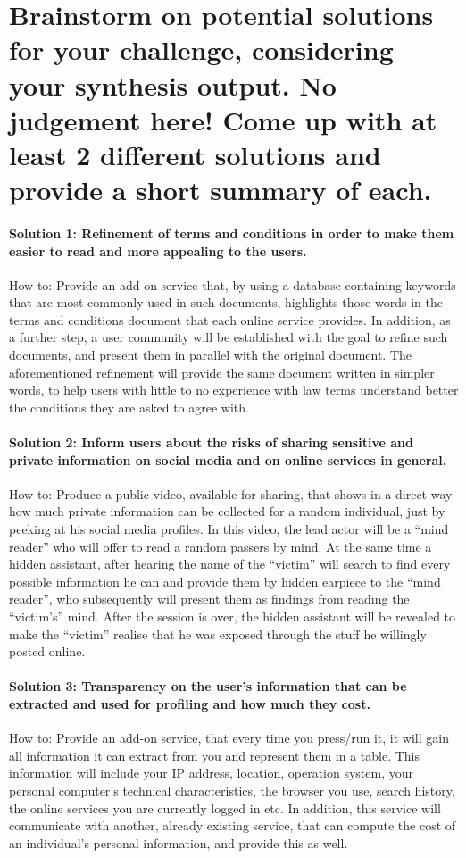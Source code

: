 \section{Brainstorm on potential solutions for your challenge, considering your 
synthesis output. No judgement here! Come up with at least 2 different solutions 
and provide a short summary of each.}
\label{s_1}

\paragraph{Solution 1: Refinement of terms and conditions in order to make them 
easier to read and more appealing to the users.} 
How to: Provide an add-on service that, by using a database containing keywords 
that are most commonly used in such documents, highlights those words in the 
terms and conditions document that each online service provides. In addition, as 
a further step, a user community will be established with the goal to refine 
such documents, and present them in parallel with the original document. The 
aforementioned refinement will provide the same document written in simpler 
words, to help users with little to no experience with law terms understand 
better the conditions they are asked to agree with.

\paragraph{Solution 2: Inform users about the risks of sharing sensitive and 
private information on social media and on online services in general.} 
How to: Produce a public video, available for sharing, that shows in a direct 
way how much private information can be collected for a random individual, just 
by peeking at his social media profiles. In this video, the lead actor will be a 
``mind reader'' who will offer to read a random passers by mind. At the same 
time a hidden assistant, after hearing the name of the ``victim'' will search to 
find every possible information he can and provide them by hidden earpiece to 
the ``mind reader'', who subsequently will present them as findings from reading 
the ``victim's'' mind. After the session is over, the hidden assistant will be 
revealed to make the ``victim'' realise that he was exposed through the stuff he 
willingly posted online.

\paragraph{Solution 3: Transparency on the user's information that can be 
extracted and used for profiling and how much they cost.} 
How to: Provide an add-on service, that every time you press/run it, it will gain 
all information it can extract from you and represent them in a table. This 
information will include your IP address, location, operation system, your 
personal computer's technical characteristics, the browser you use, search 
history, the online services you are currently logged in etc. In addition, this 
service will communicate with another, already existing service, that can 
compute the cost of an individual's personal information, and provide this as 
well.

